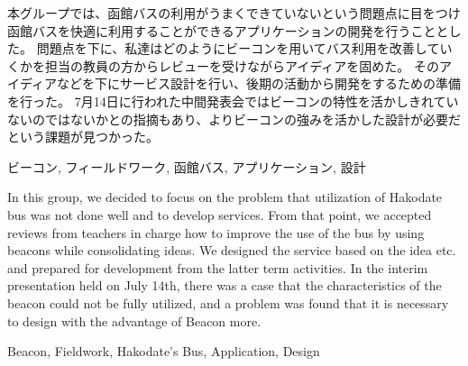 \documentclass[openany,11pt,papersize]{jsbook}
\begin{document}
  \maketitle
  
  \frontmatter
  
  \begin{jabstract}
  
  
  

本グループでは、函館バスの利用がうまくできていないという問題点に目をつけ函館バスを快適に利用することができるアプリケーションの開発を行うこととした。
問題点を下に、私達はどのようにビーコンを用いてバス利用を改善していくかを担当の教員の方からレビューを受けながらアイディアを固めた。
そのアイディアなどを下にサービス設計を行い、後期の活動から開発をするための準備を行った。
7月14日に行われた中間発表会ではビーコンの特性を活かしきれていないのではないかとの指摘もあり、よりビーコンの強みを活かした設計が必要だという課題が見つかった。

\begin{jkeyword}
ビーコン, フィールドワーク, 函館バス, アプリケーション, 設計
\end{jkeyword}
\end{jabstract}

\begin{eabstract}

 

In this group, we decided to focus on the problem that utilization of Hakodate bus was not done well and to develop services.
From that point, we accepted reviews from teachers in charge how to improve the use of the bus by using beacons while consolidating ideas.
We designed the service based on the idea etc. and prepared for development from the latter term activities.
In the interim presentation held on July 14th, there was a case that the characteristics of the beacon could not be fully utilized, and a problem was found that it is necessary to design with the advantage of Beacon more.

\begin{ekeyword}
Beacon, Fieldwork, Hakodate's Bus, Application, Design
\end{ekeyword}
\end{eabstract}
\end{document}
